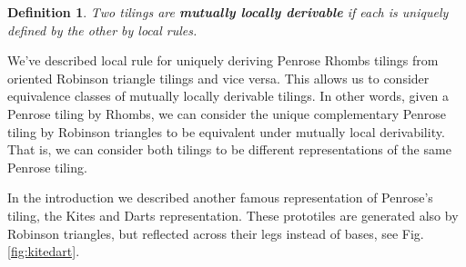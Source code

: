 \documentclass[
  oneside,
  11pt, a4paper,
  footinclude=true,
  headinclude=true,
  cleardoublepage=empty
]{scrbook}
\newtheorem{mydef}{Definition}
\begin{document}
\begin{mydef}
Two tilings are \textbf{mutually locally derivable} if each is uniquely defined by the other by local rules. 
\end{mydef}

We've described local rule for uniquely deriving Penrose Rhombs tilings from oriented Robinson triangle tilings and vice versa. This allows us to consider equivalence classes of mutually locally derivable tilings. In other words, given a Penrose tiling by Rhombs, we can consider the unique complementary Penrose tiling by Robinson triangles to be equivalent under mutually local derivability. That is, we can consider both tilings to be different representations of the same Penrose tiling.

In the introduction we described another famous representation of Penrose's tiling, the Kites and Darts representation. These prototiles are generated also by Robinson triangles, but reflected across their legs instead of bases, see Fig.\ref{fig:kitedart}.
\end{document}
